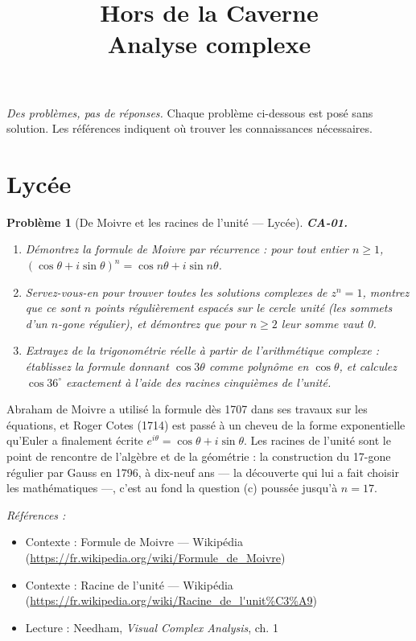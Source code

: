 \documentclass[11pt]{article}
\title{Hors de la Caverne \\ \Large Analyse complexe}
\author{}
\date{}
\newtheorem{problem}{Problème}
\newenvironment{refs}{\par\small\noindent\emph{Références :}\begin{itemize}\setlength\itemsep{0pt}}{\end{itemize}\normalsize}
\begin{document}
\maketitle
\noindent\emph{Des problèmes, pas de réponses.} Chaque problème ci-dessous est posé
sans solution. Les références indiquent où trouver les connaissances nécessaires.
\medskip


\section*{Lycée}

\begin{problem}[{De Moivre et les racines de l'unité --- Lycée}]
\textbf{CA-01.} \begin{enumerate}
\item[(a)] Démontrez la formule de Moivre par récurrence : pour tout
entier $ n \ge 1 $,
$ (\cos\theta + i\sin\theta)^n = \cos n\theta + i\sin n\theta $.
\item[(b)] Servez-vous-en pour trouver toutes les solutions complexes de $ z^n = 1 $, montrez que ce sont
$ n $ points régulièrement espacés sur le cercle unité (les sommets d'un $ n $-gone régulier), et
démontrez que pour $ n \ge 2 $ leur somme vaut 0.
\item[(c)] Extrayez de la trigonométrie réelle à partir de l'arithmétique complexe : établissez
la formule donnant $ \cos 3\theta $ comme polynôme en $ \cos\theta $, et calculez
$ \cos 36^\circ $ exactement à l'aide des racines cinquièmes de l'unité.
\end{enumerate}

\end{problem}

\noindent Abraham de Moivre a utilisé la formule dès 1707 dans ses travaux sur les
équations, et Roger Cotes (1714) est passé à un cheveu de la forme exponentielle qu'Euler a
finalement écrite $ e^{i\theta} = \cos\theta + i\sin\theta $. Les racines de l'unité sont le point
de rencontre de l'algèbre et de la géométrie : la construction du 17-gone régulier par Gauss en
1796, à dix-neuf ans --- la découverte qui lui a fait choisir les mathématiques ---, c'est au fond la
question (c) poussée jusqu'à $ n = 17 $.

\begin{refs}
\item Contexte : Formule de Moivre --- Wikipédia (\url{https://fr.wikipedia.org/wiki/Formule_de_Moivre})
\item Contexte : Racine de l'unité --- Wikipédia (\url{https://fr.wikipedia.org/wiki/Racine_de_l'unit%C3%A9})
\item Lecture : Needham, \textit{Visual Complex Analysis}, ch. 1
\end{refs}
\end{document}
